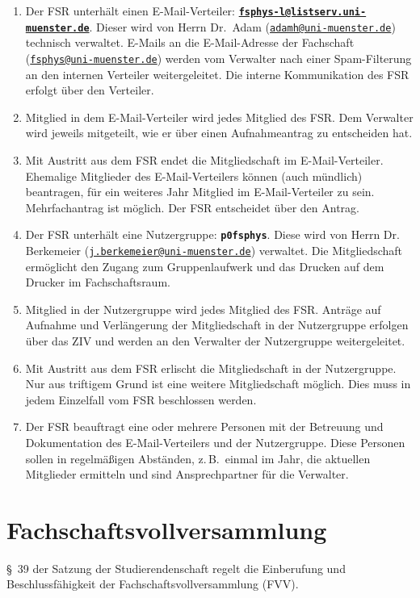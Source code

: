 \documentclass[
	a4paper,
	12pt,
	oneside,
	parskip=half-,
	pagesize,
	headsepline,
	german,
	ngerman
]{scrartcl}
\newcommand{\email}[1]{\href{mailto:#1}{\texttt{#1}}}
\begin{document}
\begin{enumerate}
	\item Der FSR unterhält einen E-Mail-Verteiler: \textbf{\email{fsphys-l@listserv.uni-muenster.de}}. Dieser wird von Herrn Dr.\ Adam (\email{adamh@uni-muenster.de}) technisch verwaltet. E-Mails an die E-Mail-Adresse der Fachschaft (\email{fsphys@uni-muenster.de}) werden vom Verwalter nach einer Spam-Filterung an den internen Verteiler weitergeleitet. Die interne Kommunikation des FSR erfolgt über den Verteiler.
	\item Mitglied in dem E-Mail-Verteiler wird jedes Mitglied des FSR. Dem Verwalter wird jeweils mitgeteilt, wie er über einen Aufnahmeantrag zu entscheiden hat.
	\item Mit Austritt aus dem FSR endet die Mitgliedschaft im E-Mail-Verteiler. Ehemalige Mitglieder des E-Mail-Verteilers können (auch mündlich) beantragen, für ein weiteres Jahr Mitglied im E-Mail-Verteiler zu sein. Mehrfachantrag ist möglich. Der FSR entscheidet über den Antrag.
	\item Der FSR unterhält eine Nutzergruppe: \textbf{\texttt{p0fsphys}}. Diese wird von Herrn Dr. Berkemeier (\email{j.berkemeier@uni-muenster.de}) verwaltet. Die Mitgliedschaft ermöglicht den Zugang zum Gruppenlaufwerk und das Drucken auf dem Drucker im Fachschaftsraum.
	\item Mitglied in der Nutzergruppe wird jedes Mitglied des FSR. Anträge auf Aufnahme und Verlängerung der Mitgliedschaft in der Nutzergruppe erfolgen über das ZIV und werden an den Verwalter der Nutzergruppe weitergeleitet.
	\item Mit Austritt aus dem FSR erlischt die Mitgliedschaft in der Nutzergruppe. Nur aus triftigem Grund ist eine weitere Mitgliedschaft möglich. Dies muss in jedem Einzelfall vom FSR beschlossen werden.
	\item Der FSR beauftragt eine oder mehrere Personen mit der Betreuung und Dokumentation des E-Mail-Verteilers und der Nutzergruppe. Diese Personen sollen in regelmäßigen Abständen, z.\,B.\ einmal im Jahr, die aktuellen Mitglieder ermitteln und sind Ansprechpartner für die Verwalter.
	\label{item:Ansprechpartner}
\end{enumerate}

\section{Fachschaftsvollversammlung}
§~39 der Satzung der Studierendenschaft regelt die Einberufung und Beschlussfähigkeit der Fachschaftsvollversammlung (FVV).
\end{document}
